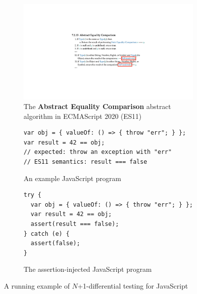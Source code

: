 \begin{figure}[t]
  \centering
  \begin{subfigure}[t]{0.48\textwidth}
    \includegraphics[width=\textwidth]{img/example-algo.pdf}
    \caption{The \textbf{Abstract Equality Comparison} abstract algorithm in
    ECMAScript 2020 (ES11)}
    \label{fig:example-algo}
  \end{subfigure}
  \begin{subfigure}[t]{0.43\textwidth}
    \begin{lstlisting}[style=myJSstyle]
var obj = { valueOf: () => { throw "err"; } };
var result = 42 == obj;
// expected: throw an exception with "err"
// ES11 semantics: result === false
    \end{lstlisting}
    \caption{An example JavaScript program}
    \label{fig:example-js}
  \end{subfigure}
  \begin{subfigure}[t]{0.45\textwidth}
    \begin{lstlisting}[style=myJSstyle]
try {
  var obj = { valueOf: () => { throw "err"; } };
  var result = 42 == obj;
  assert(result === false);
} catch (e) {
  assert(false);
}
    \end{lstlisting}
    \caption{The assertion-injected JavaScript program}
    \label{fig:example-injected}
  \end{subfigure}
  \caption{A running example of $N$+1-differential testing for JavaScript}
  \label{fig:example}
  \vspace*{-1em}
\end{figure}

